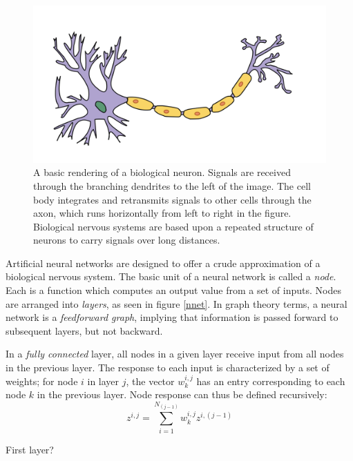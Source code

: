 \begin{figure}[t]
  \begin{center}
    \includegraphics[width=\textwidth]{figures/figures/neuron.png}
  \end{center}
  \caption[A basic rendering of a biological neuron]{A basic rendering of a biological neuron.  Signals are received through the branching dendrites to the left of the image.  The cell body integrates and retransmits signals to other cells through the axon, which runs horizontally from left to right in the figure.  Biological nervous systems are based upon a repeated structure of neurons to carry signals over long distances.}

  \label{neuron}
\end{figure}


Artificial neural networks are designed to offer a crude approximation of a biological nervous system.  The basic unit of a neural network is called a \textit{node}.  Each is a function which computes an output value from a set of inputs.  Nodes are arranged into \textit{layers}, as seen in figure \ref{nnet}.  In graph theory terms, a neural network is a \textit{feedforward graph}, implying that information is passed forward to subsequent layers, but not backward.


In a \textit{fully connected} layer, all nodes in a given layer receive input from all nodes in the previous layer.  The response to each input is characterized by a set of weights; for node $i$ in layer $j$, the vector $w_{k}^{i,j}$ has an entry corresponding to each node $k$ in the previous layer.  Node response can thus be defined recursively:
\begin{equation}
z^{i,j} = \sum_{i=1}^{N_{(j-1)}} w_{k}^{i,j} z^{i,(j-1)}
\end{equation}

First layer? 

